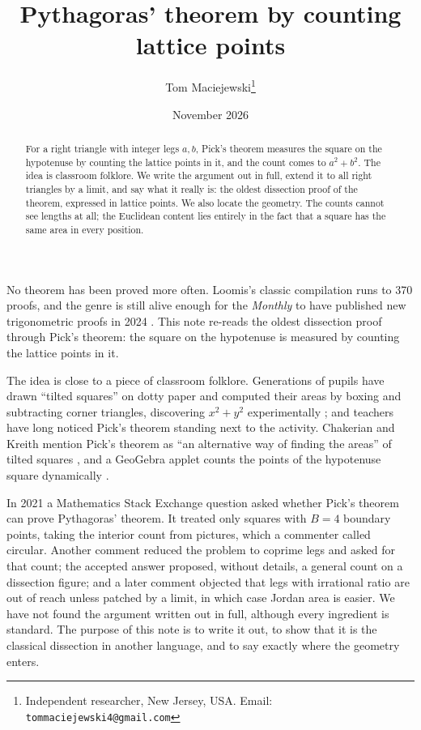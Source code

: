 \documentclass[11pt,a4paper]{article}
\title{Pythagoras' theorem by counting lattice points}
\author{Tom Maciejewski\thanks{Independent researcher, New Jersey, USA. Email: \texttt{tommaciejewski4@gmail.com}}}
\date{November 2026}
\theoremstyle{remark}
\begin{document}
\maketitle

\begin{abstract}
For a right triangle with integer legs $a,b$, Pick's theorem measures the square
on the hypotenuse by counting the lattice points in it, and the count comes to
$a^2+b^2$. The idea is classroom folklore. We write the argument out in full,
extend it to all right triangles by a limit, and say what it really is: the
oldest dissection proof of the theorem, expressed in lattice points. We also
locate the geometry. The counts cannot see lengths at all; the Euclidean content
lies entirely in the fact that a square has the same area in every position.
\end{abstract}

\noindent
No theorem has been proved more often. Loomis's classic compilation
\cite{loomis} runs to 370 proofs, and the genre is still alive enough for the
\emph{Monthly} to have published new trigonometric proofs in 2024
\cite{jackson-johnson}. This note re-reads the oldest dissection proof through
Pick's theorem: the square on the hypotenuse is measured by counting the lattice
points in it.

The idea is close to a piece of classroom folklore. Generations of pupils have
drawn ``tilted squares'' on dotty paper and computed their areas by boxing and
subtracting corner triangles, discovering $x^2+y^2$ experimentally
\cite{nrich, picciotto}; and teachers have long noticed Pick's theorem standing
next to the activity. Chakerian and Kreith mention Pick's theorem as ``an
alternative way of finding the areas'' of tilted squares \cite{chakerian}, and
a GeoGebra applet counts the points of the hypotenuse square dynamically
\cite{mil}.

In 2021 a Mathematics Stack Exchange question \cite{mse} asked whether Pick's
theorem can prove Pythagoras' theorem. It treated only squares with $B=4$
boundary points, taking the interior count from pictures, which a commenter
called circular. Another comment reduced the problem to coprime legs and asked
for that count; the accepted answer proposed, without details, a general count
on a dissection figure; and a later comment objected that legs with irrational
ratio are out of reach unless patched by a limit, in which case Jordan area is
easier. We have not found the argument written out in full, although every
ingredient is standard. The purpose of this note is to write it out, to show
that it is the classical dissection in another language, and to say exactly
where the geometry enters.
\end{document}
